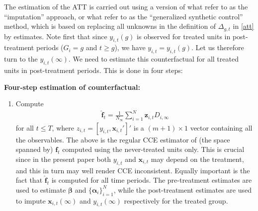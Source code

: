 \documentclass[12pt,fleqn]{article}
\def\*#1{\mathbf{#1}}
\def\+#1{\boldsymbol{#1}}
\begin{document}
The estimation of the ATT is carried out using a version of what \citet{borusyak2021revisiting} refer to as the ``imputation'' approach, or what \citet{Xu_2017} refer to as the ``generalized synthetic control'' method, which is based on replacing all unknowns in the definition of $\Delta_{g,t}$ in \eqref{att} by estimates. Note first that since $y_{i,t}(g)$ is observed for treated units in post-treatment periods ($G_i = g$ and $t \geq g$), we have $y_{i,t} = y_{i,t}(g)$. Let us therefore turn to the $y_{i,t}(\infty)$. We need to estimate this counterfactual for all treated units in post-treatment periods. This is done in four steps:
\textbf{}
\bigskip

\noindent \textbf{Four-step estimation of counterfactual:}

\begin{enumerate}
\item Compute
\begin{align}
\widehat{\*f}_t = \frac{1}{N_{\infty}}\sum_{i = 1}^N \*z_{i,t} D_{i,\infty} \label{fhat}
\end{align}
for all $t\leq T$, where $z_{i,t} = [y_{i,t},\*x_{i,t}']'$ is a $(m+1)\times 1$ vector containing all the observables. The above is the regular CCE estimator of (the space spanned by) $\*f_t$ computed using the never-treated units only. This is crucial since in the present paper both $y_{i,t}$ and $\*x_{i,t}$ may depend on the treatment, and this in turn may well render CCE inconsistent. Equally important is the fact that $\widehat{\*f}_t$ is computed for all time periods. The pre-treatment estimates are used to estimate $\+\beta$ and $\{\+\alpha_i\}_{i=1}^N$, while the post-treatment estimates are used to impute $\*x_{i,t}(\infty)$ and $y_{i,t}(\infty)$ respectively for the treated group.


\end{enumerate}
\end{document}
